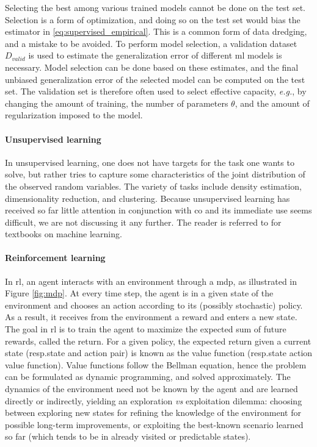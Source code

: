 \documentclass[11pt]{article}
\begin{document}
		Selecting the best among various trained models cannot be done on the test set.
		Selection is a form of optimization, and doing so on the test set would bias the estimator in
		\eqref{eq:supervised_empirical}.
		This is a common form of data dredging, and a mistake to be avoided.
		To perform model selection, a validation dataset $D_{valid}$ is used to estimate the generalization
		error of different \gls{ml} models is necessary.
		Model selection can be done based on these estimates, and the final unbiased generalization error
		of the selected model can be computed on the test set. The validation set is therefore often used
		to select effective capacity, \textit{e.g.}, by changing the amount of training, the number of parameters
		$\theta$, and the amount of regularization imposed to the model.

		\paragraph{Unsupervised learning}
		In unsupervised learning, one does not have targets for the task one wants to solve, but rather
		tries to capture some characteristics of the joint distribution of the observed random variables.
		The variety of tasks include density estimation, dimensionality reduction, and clustering.
		Because unsupervised learning has received so far little attention in conjunction with \gls{co} and
		its immediate use seems difficult, we are not discussing it any further.
		The reader is referred to \cite{bishop2006pattern,murphy2012machine,goodfellow2016deep} for
		textbooks on machine learning.

		\paragraph{Reinforcement learning}
		In \gls{rl}, an agent interacts with an environment through a \gls{mdp}, as illustrated in Figure
		\ref{fig:mdp}.
		At every time step, the agent is in a given state of the environment and chooses an action
		according to its (possibly stochastic) policy.
		As a result, it receives from the environment a reward and enters a new state.
		The goal in \gls{rl} is to train the agent to maximize the expected sum of future rewards, called the
		return.
		For a given policy, the expected return given a current state (resp.\@ state and action pair) is
		known as the value function (resp.\@ state action value function).
		Value functions follow the Bellman equation, hence the problem can be formulated as dynamic
		programming, and solved approximately.
		The dynamics of the environment need not be known by the agent and are learned directly or
		indirectly, yielding an exploration \textit{vs} exploitation dilemma: choosing between exploring
		new states for refining the knowledge of the environment for possible long-term improvements, or
		exploiting the best-known scenario learned so far (which tends to be in already visited or
		predictable states).
\end{document}
